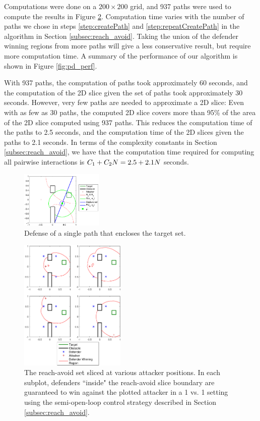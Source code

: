 Computations were done on a $200\times200$ grid, and 937 paths were used to compute the results in Figure \ref{fig:pd_pw}. Computation time varies with the number of paths we chose in steps \ref{step:createPath} and \ref{step:repeatCreatePath} in the algorithm in Section \ref{subsec:reach_avoid}. Taking the union of the defender winning regions from more paths will give a less conservative result, but require more computation time. A summary of the performance of our algorithm is shown in Figure \ref{fig:pd_perf}. 

With 937 paths, the computation of paths took approximately 60 seconds, and the computation of the 2D slice given the set of paths took approximately 30 seconds. However, very few paths are needed to approximate a 2D slice: Even with as few as 30 paths, the computed 2D slice covers more than 95\% of the area of the 2D slice computed using 937 paths. This reduces the computation time of the paths to 2.5 seconds, and the computation time of the 2D slices given the paths to 2.1 seconds. In terms of the complexity constants in Section \ref{subsec:reach_avoid}, we have that the computation time required for computing all pairwise interactions is $C_1 + C_2 N = 2.5 + 2.1 N$ seconds.

\begin{figure}
	\centering
	\includegraphics[width=0.35\textwidth]{"fig/PD Example"}
	\caption{Defense of a single path that encloses the target set.}
	\label{fig:pd_ex}
\end{figure}

\begin{figure}
	\centering
	\includegraphics[width=0.45\textwidth]{"fig/OLGame_pw_results_PD"}
	\caption{The reach-avoid set sliced at various attacker positions. In each subplot, defenders ``inside" the reach-avoid slice boundary are guaranteed to win against the plotted attacker in a 1 vs. 1 setting using the semi-open-loop control strategy described in Section \ref{subsec:reach_avoid}.}
	\label{fig:pd_pw}
\end{figure}

